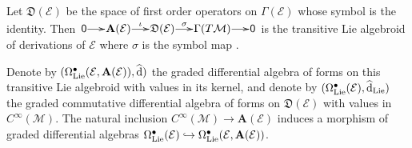 \documentclass[number]{elsarticle}
\theoremstyle{definition}
\theoremstyle{remark}
\numberwithin{equation}{section}
\begin{document}
Let ${{\mathfrak D}}({{{{\mathcal{{E}}}}}})$ be the space of first order operators on $\Gamma({{{{\mathcal{{E}}}}}})$ whose symbol is the identity. Then $\xymatrix@1@C=15pt{{{{{\mathsf{{0}}}}}} \ar[r] & {{{{{\mathbf{{A}}}}}}({{{{\mathcal{{E}}}}}})} \ar[r]^-{\iota} & {{{\mathfrak D}}({{{{\mathcal{{E}}}}}})} \ar[r]^-{\sigma} & {\Gamma(T {{{{\mathcal{{M}}}}}})} \ar[r] & {{{{\mathsf{{0}}}}}}}$ is the transitive Lie algebroid of derivations of ${{{{\mathcal{{E}}}}}}$ where $\sigma$ is the symbol map \cite{MR585879}.

Denote by $(\Omega^{\bullet}_{{\text{\textup{Lie}}}}({{{{\mathcal{{E}}}}}}, {{{{\mathbf{{A}}}}}}({{{{\mathcal{{E}}}}}})), {\widehat{\text{\textup{d}}}})$ the graded differential algebra of forms on this transitive Lie algebroid with values in its kernel, and denote by $(\Omega^{\bullet}_{{\text{\textup{Lie}}}}({{{{\mathcal{{E}}}}}}), {\widehat{\text{\textup{d}}}}_{{\text{\textup{Lie}}}})$ the graded commutative differential algebra of forms on ${{\mathfrak D}}({{{{\mathcal{{E}}}}}})$ with values in $C^\infty({{{{\mathcal{{M}}}}}})$. The natural inclusion $C^\infty({{{{\mathcal{{M}}}}}}) \rightarrow {{{{\mathbf{{A}}}}}}({{{{\mathcal{{E}}}}}})$ induces a morphism of graded differential algebras $\Omega^{\bullet}_{{\text{\textup{Lie}}}}({{{{\mathcal{{E}}}}}}) \hookrightarrow \Omega^{\bullet}_{{\text{\textup{Lie}}}}({{{{\mathcal{{E}}}}}}, {{{{\mathbf{{A}}}}}}({{{{\mathcal{{E}}}}}}))$.
\end{document}
